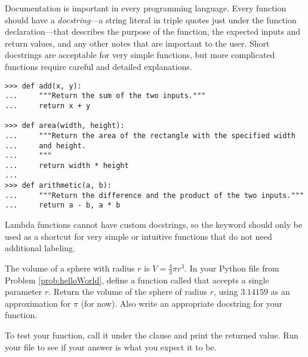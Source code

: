\begin{info}
Documentation is important in every programming language.
Every function should have a \emph{docstring}---a string literal in triple quotes just under the function declaration---that describes the purpose of the function, the expected inputs and return values, and any other notes that are important to the user.
Short docstrings are acceptable for very simple functions, but more complicated functions require careful and detailed explanations.

\begin{lstlisting}
>>> def add(x, y):
...     """Return the sum of the two inputs."""
...     return x + y

>>> def area(width, height):
...     """Return the area of the rectangle with the specified width
...     and height.
...     """
...     return width * height
...
>>> def arithmetic(a, b):
...     """Return the difference and the product of the two inputs."""
...     return a - b, a * b
\end{lstlisting}

Lambda functions cannot have custom docstrings, so the  keyword should only be used as a shortcut for very simple or intuitive functions that do not need additional labeling.
\end{info}

\begin{problem} %
The volume of a sphere with radius $r$ is $V = \frac{4}{3}\pi r^3$.
In your Python file from Problem \ref{prob:helloWorld}, define a function called  that accepts a single parameter $r$.
Return the volume of the sphere of radius $r$, using $3.14159$ as an approximation for $\pi$ (for now).
Also write an appropriate docstring for your function.

To test your function, call it under the  clause and print the returned value.
Run your file to see if your answer is what you expect it to be.
\end{problem}

